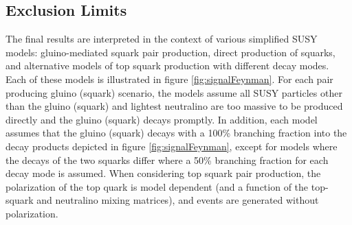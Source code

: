 \subsection{Exclusion Limits}
\label{subsec:exclusionLimits}

The final results are interpreted in the context of various simplified SUSY models: gluino-mediated squark pair production, direct production of squarks, and alternative models of top squark production with different decay modes. Each of these models is illustrated in figure \ref{fig:signalFeynman}. For each pair producing gluino (squark) scenario, the models assume all SUSY particles other than the gluino (squark) and lightest neutralino are too massive to be produced directly and the gluino (squark) decays promptly. In addition, each model assumes that the gluino (squark) decays with a 100\% branching fraction into the decay products depicted in figure \ref{fig:signalFeynman}, except for models where the decays of the two squarks differ where a 50\% branching fraction for each decay mode is assumed. When considering top squark pair production, the polarization of the top quark is model dependent (and a function of the top-squark and neutralino mixing matrices), and events are generated without polarization.
